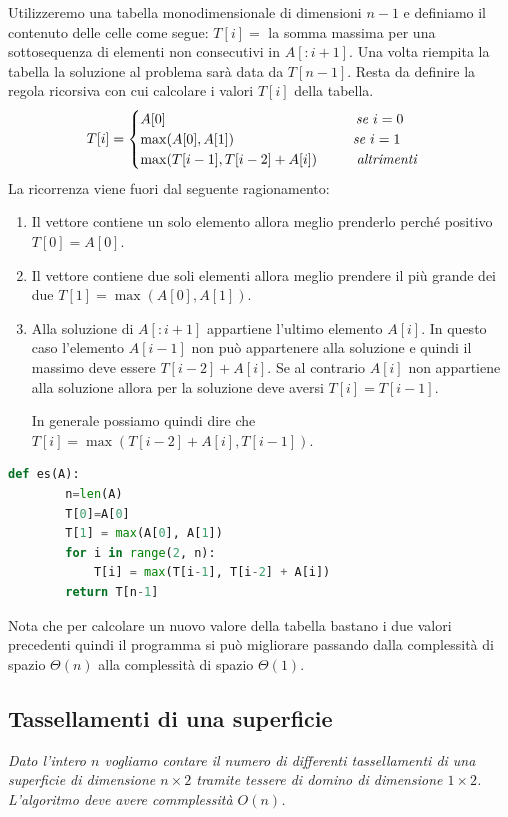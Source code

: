 Utilizzeremo una tabella monodimensionale di dimensioni $n-1$ e definiamo il contenuto delle celle come segue:  $T[i] =$ la somma massima per una sottosequenza di elementi non consecutivi in $A[:i+1]$.
Una volta riempita la tabella la soluzione al problema sarà data da $T[n-1]$. Resta da definire la regola ricorsiva con cui calcolare i valori $T[i]$ della tabella.
\begin{equation*}T[i]=
    \begin{cases}
        A[0]\hspace{4.8cm}\textit{se } i=0\\
        \max(A[0], A[1])\hspace{3cm}\textit{se } i=1\\
        \max(T[i-1], T[i-2] + A[i])\hspace{1cm}\textit{altrimenti}
    \end{cases}
\end{equation*}
La ricorrenza viene fuori dal seguente ragionamento:
\begin{enumerate}
    \item Il vettore contiene un solo elemento allora meglio prenderlo perché positivo $T[0]=A[0]$.
    \item Il vettore contiene due soli elementi allora meglio prendere il più grande dei due $T[1] = \max(A[0], A[1])$.
    \item Alla soluzione di $A[:i+1]$ appartiene l’ultimo elemento $A[i]$. In questo caso l’elemento $A[i-1]$ non può appartenere alla soluzione e quindi il massimo deve essere $T[i - 2] + A[i]$. Se al contrario $A[i]$ non appartiene alla soluzione allora per la soluzione deve aversi $T[i] = T[i - 1]$.

    In generale possiamo quindi dire che $T[i] = \max(T[i - 2] + A[i], T[i - 1])$.
\end{enumerate}
\begin{lstlisting}[language=Python]
    def es(A):
        n=len(A)
        T[0]=A[0]
        T[1] = max(A[0], A[1])
        for i in range(2, n):
            T[i] = max(T[i-1], T[i-2] + A[i])
        return T[n-1]
\end{lstlisting}
Nota che per calcolare un nuovo valore della tabella bastano i due valori precedenti quindi il programma si può migliorare passando dalla complessità di spazio $\Theta(n)$ alla complessità di spazio $\Theta(1)$.

\subsection{Tassellamenti di una superficie}
\textit{Dato l’intero $n$ vogliamo contare il numero di differenti tassellamenti di una superficie di dimensione $n\times 2$ tramite tessere di domino di dimensione $1\times 2$. L'algoritmo deve avere commplessità $O(n)$.}

